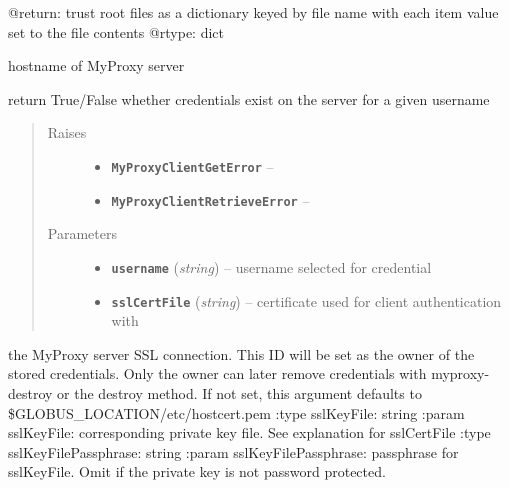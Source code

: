 \documentclass[letterpaper,10pt,english]{sphinxmanual}
\begin{document}
\begin{fulllineitems}
\begin{fulllineitems}
@return: trust root files as a dictionary keyed by file name with each 
item value set to the file contents
@rtype: dict

\end{fulllineitems}


\begin{fulllineitems}
\label{client:myproxy.client.MyProxyClient.hostname}
hostname of MyProxy server

\end{fulllineitems}


\begin{fulllineitems}
\label{client:myproxy.client.MyProxyClient.info}
return True/False whether credentials exist on the server for a 
given username
\begin{quote}\begin{description}
\item[{Raises}] \leavevmode\begin{itemize}
\item {} 
\textbf{\texttt{MyProxyClientGetError}} -- 

\item {} 
\textbf{\texttt{MyProxyClientRetrieveError}} -- 

\end{itemize}

\item[{Parameters}] \leavevmode\begin{itemize}
\item {} 
\textbf{\texttt{username}} (\emph{string}) -- username selected for credential

\item {} 
\textbf{\texttt{sslCertFile}} (\emph{string}) -- certificate used for client authentication with

\end{itemize}

\end{description}\end{quote}

the MyProxy server SSL connection.  This ID will be set as the owner
of the stored credentials.  Only the owner can later remove 
credentials with myproxy-destroy or the destroy method.  If not set,
this argument defaults to \$GLOBUS\_LOCATION/etc/hostcert.pem 
:type sslKeyFile: string 
:param sslKeyFile: corresponding private key file.  See explanation
for sslCertFile
:type sslKeyFilePassphrase: string
:param sslKeyFilePassphrase: passphrase for sslKeyFile.  Omit if the
private key is not password protected.


\end{fulllineitems}
\end{fulllineitems}
\end{document}
